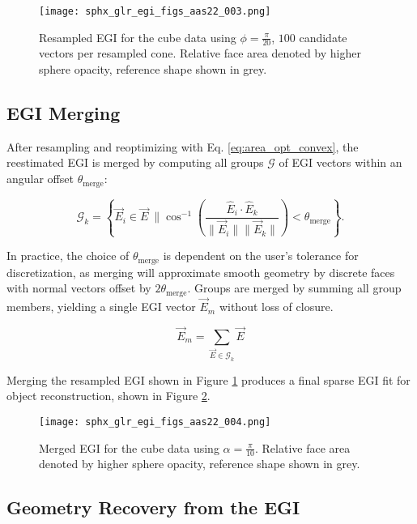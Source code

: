 \begin{figure}[!htb]
  \centering
  \texttt{[image: sphx\_glr\_egi\_figs\_aas22\_003.png]}
  \caption{Resampled EGI for the cube data using $\phi = \frac{\pi}{20}$, $100$ candidate vectors per resampled cone. Relative face area denoted by higher sphere opacity, reference shape shown in grey.}
  \label{fig:resampled_egi}
\end{figure}

\subsection{EGI Merging}

After resampling and reoptimizing with Eq. \ref{eq:area_opt_convex}, the reestimated EGI is merged by computing all groups $\mathcal{G}$ of EGI vectors within an angular offset $\theta_\mathrm{merge}$:

\begin{equation} \label{eq:egi_merge}
  \mathcal{G}_k = \left\{ \vec{E}_i \in \vec{E} \:\| \cos^{-1}\left( \frac{\hat{E}_i \cdot \hat{E}_k}{\|\vec{E}_i \| \| \vec{E}_k \|}\right) < \theta_\mathrm{merge} \right\}.
\end{equation}

In practice, the choice of $\theta_\mathrm{merge}$ is dependent on the user's tolerance for discretization, as merging will approximate smooth geometry by discrete faces with normal vectors offset by $2\theta_\mathrm{merge}$. Groups are merged by summing all group members, yielding a single EGI vector $\vec{E}_m$ without loss of closure. 

\begin{equation} \label{eq:fixing_egi}
  \vec{E}_m = \sum_{\vec{E} \in \mathcal{G}_k}{\vec{E}}
\end{equation}

Merging the resampled EGI shown in Figure \ref{fig:resampled_egi} produces a final sparse EGI fit for object reconstruction, shown in Figure \ref{fig:merged_egi}. 

\begin{figure}[!htb]
  \centering
  \texttt{[image: sphx\_glr\_egi\_figs\_aas22\_004.png]}
  \caption{Merged EGI for the cube data using $\alpha = \frac{\pi}{10}$. Relative face area denoted by higher sphere opacity, reference shape shown in grey.}
  \label{fig:merged_egi}
\end{figure}

\subsection{Geometry Recovery from the EGI}

